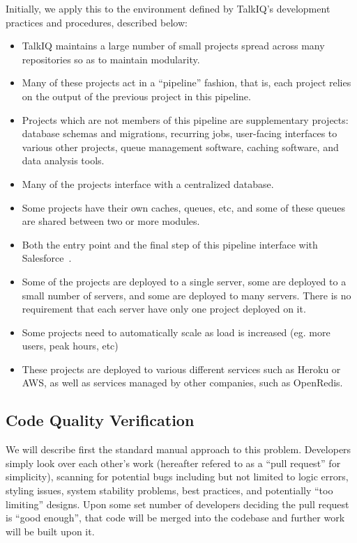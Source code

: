 \documentclass[12pt]{article}
\begin{document}
Initially, we apply this to the environment defined by TalkIQ's development practices and procedures, described below:
\begin{itemize}
\item TalkIQ maintains a large number of small projects spread across many repositories so as to maintain modularity.
\item Many of these projects act in a ``pipeline'' fashion, that is, each project relies on the output of the previous project in this pipeline.
\item Projects which are not members of this pipeline are supplementary projects: database schemas and migrations, recurring jobs, user-facing interfaces to various other projects, queue management software, caching software, and data analysis tools.
\item Many of the projects interface with a centralized database.
\item Some projects have their own caches, queues, etc, and some of these queues are shared between two or more modules.
\item Both the entry point and the final step of this pipeline interface with Salesforce~\cite{talkiq}.
\item Some of the projects are deployed to a single server, some are deployed to a small number of servers, and some are deployed to many servers. There is no requirement that each server have only one project deployed on it.
\item Some projects need to automatically scale as load is increased (eg. more users, peak hours, etc)
\item These projects are deployed to various different services such as Heroku or AWS, as well as services managed by other companies, such as OpenRedis.
\end{itemize}

\subsection{Code Quality Verification}
We will describe first the standard manual approach to this problem. Developers simply look over each other's work (hereafter refered to as a ``pull request'' for simplicity), scanning for potential bugs including but not limited to logic errors, styling issues, system stability problems, best practices, and potentially ``too limiting'' designs. Upon some set number of developers deciding the pull request is ``good enough'', that code will be merged into the codebase and further work will be built upon it.
\end{document}
